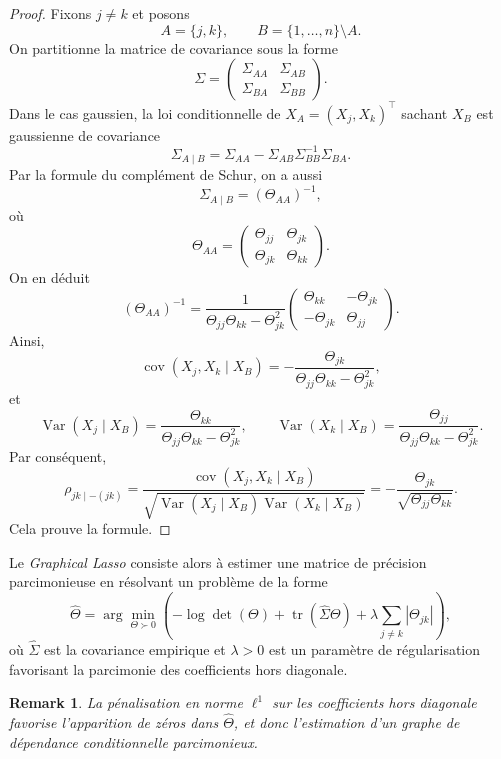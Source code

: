 \documentclass[10pt]{article}
\newtheorem{rem}[thm]{Remark}
\DeclareMathOperator{\cov}{cov}
\DeclareMathOperator{\Var}{Var}
\begin{document}
\begin{proof}
	Fixons $j\neq k$ et posons
	\[
		A=\{j,k\}, \qquad B=\{1,\dots,n\}\setminus A.
	\]
	On partitionne la matrice de covariance sous la forme
	\[
		\Sigma =
		\begin{pmatrix}
			\Sigma_{AA} & \Sigma_{AB} \\
			\Sigma_{BA} & \Sigma_{BB}
		\end{pmatrix}.
	\]
	Dans le cas gaussien, la loi conditionnelle de $X_A=(X_j,X_k)^\top$ sachant $X_B$ est gaussienne de covariance
	\[
		\Sigma_{A\mid B}
		=
		\Sigma_{AA}-\Sigma_{AB}\Sigma_{BB}^{-1}\Sigma_{BA}.
	\]
	Par la formule du complément de Schur, on a aussi
	\[
		\Sigma_{A\mid B} = (\Theta_{AA})^{-1},
	\]
	où
	\[
		\Theta_{AA}=
		\begin{pmatrix}
			\Theta_{jj} & \Theta_{jk} \\
			\Theta_{jk} & \Theta_{kk}
		\end{pmatrix}.
	\]
	On en déduit
	\[
		(\Theta_{AA})^{-1}
		=
		\frac{1}{\Theta_{jj}\Theta_{kk}-\Theta_{jk}^2}
		\begin{pmatrix}
			\Theta_{kk}  & -\Theta_{jk} \\
			-\Theta_{jk} & \Theta_{jj}
		\end{pmatrix}.
	\]
	Ainsi,
	\[
		\cov(X_j,X_k\mid X_B)
		=
		-\frac{\Theta_{jk}}{\Theta_{jj}\Theta_{kk}-\Theta_{jk}^2},
	\]
	et
	\[
		\Var(X_j\mid X_B)
		=
		\frac{\Theta_{kk}}{\Theta_{jj}\Theta_{kk}-\Theta_{jk}^2},
		\qquad
		\Var(X_k\mid X_B)
		=
		\frac{\Theta_{jj}}{\Theta_{jj}\Theta_{kk}-\Theta_{jk}^2}.
	\]
	Par conséquent,
	\[
		\rho_{jk\mid -(jk)}
		=
		\frac{\cov(X_j,X_k\mid X_B)}
		{\sqrt{\Var(X_j\mid X_B)\Var(X_k\mid X_B)}}
		=
		-\frac{\Theta_{jk}}{\sqrt{\Theta_{jj}\Theta_{kk}}}.
	\]
	Cela prouve la formule.
\end{proof}

Le \emph{Graphical Lasso} consiste alors à estimer une matrice de précision parcimonieuse en résolvant un problème de la forme
\[
	\widehat{\Theta}
	=
	\arg\min_{\Theta \succ 0}
	\left(
	-\log\det(\Theta)
	+
	\operatorname{tr}(\widehat{\Sigma}\Theta)
	+
	\lambda \sum_{j\neq k} |\Theta_{jk}|
	\right),
\]
où $\widehat{\Sigma}$ est la covariance empirique et $\lambda>0$ est un paramètre de régularisation favorisant la parcimonie des coefficients hors diagonale.

\begin{rem}
	La pénalisation en norme $\ell^1$ sur les coefficients hors diagonale favorise l'apparition de zéros dans $\widehat{\Theta}$, et donc l'estimation d'un graphe de dépendance conditionnelle parcimonieux.
\end{rem}
\end{document}

